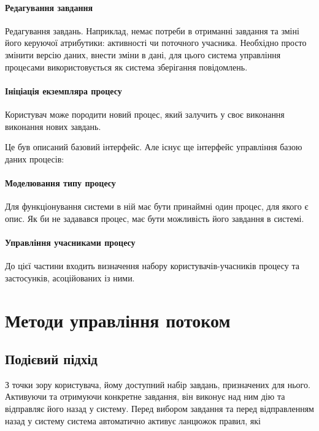 \documentclass{memoir}
\begin{document}
\paragraph{Редагування завдання}

Редагування завдань. Наприклад, немає потреби в отриманні завдання та зміні його керуючої атрибутики: активності чи поточного учасника. Необхідно просто змінити версію даних, внести зміни в дані, для цього система управління процесами використовується як система зберігання повідомлень.

\paragraph{Ініціація екземпляра процесу}

Користувач може породити новий процес, який залучить у своє виконання виконання нових завдань.

Це був описаний базовий інтерфейс. Але існує ще інтерфейс управління базою даних процесів:

\paragraph{Моделювання типу процесу}

Для функціонування системи в ній має бути принаймні один процес, для якого є опис. Як би не задавався процес, має бути можливість його завдання в системі.

\paragraph{Управління учасниками процесу}

До цієї частини входить визначення набору користувачів-учасників процесу та застосунків, асоційованих із ними.

\section{Методи управління потоком}

\subsection{Подієвий підхід}

З точки зору користувача, йому доступний набір завдань, призначених для нього. Активуючи та отримуючи конкретне завдання, він виконує над ним дію та відправляє його назад у систему. Перед вибором завдання та перед відправленням назад у систему система автоматично активує ланцюжок правил, які
\end{document}
